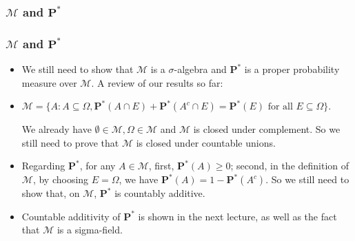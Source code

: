 \documentclass[%
]{beamer}
\newcommand{\BP}{\mathbf{P}}
\begin{document}
\subsubsection{ $\mathcal{M}$ and $\BP^*$}
\frame
{
  \frametitle{$\mathcal{M}$ and $\BP^*$}

   \begin{itemize}

            \item<1-> We still need to show that $\mathcal{M}$ is a $\sigma$-algebra and $\BP^*$ is a proper probability measure over $\mathcal{M}$. A review of our results so far:
            
              \item<2-> $\mathcal{M}=\{A: A\subseteq \Omega, \BP^*(A\cap E)+\BP^*(A^c\cap E)=\BP^*(E) \text{ for all }E\subseteq \Omega \}$.
              
              We already have $\emptyset \in \mathcal{M}, \Omega \in \mathcal{M}$ and $\mathcal{M}$ is closed under complement. So we still need to prove that $\mathcal{M}$ is closed under countable unions. 
                       
              \item<3-> Regarding $\BP^*$, for any $A\in\mathcal{M}$, first, $\BP^*(A)\geq 0$; second, in the definition of $\mathcal{M}$, by choosing $E=\Omega$, we have $\BP^*(A)=1- \BP^*(A^c)$. So we still need to show that, on $\mathcal{M}$, $\BP^*$ is countably additive. 
              
              \item<4-> Countable additivity of $\BP^*$ is shown in the next lecture, as well as the fact that $\mathcal{M}$ is a sigma-field. 
              
%              
                             
                 \end{itemize}
}
\end{document}
